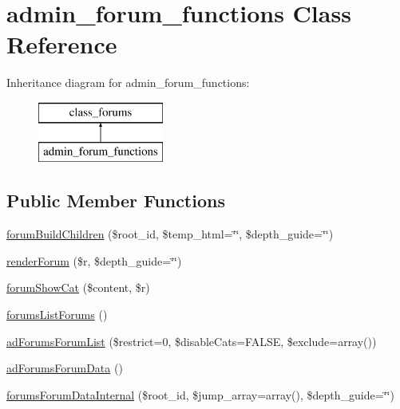 \hypertarget{classadmin__forum__functions}{\section{admin\-\_\-forum\-\_\-functions Class Reference}
\label{classadmin__forum__functions}
}
Inheritance diagram for admin\-\_\-forum\-\_\-functions\-:\begin{figure}[H]
\begin{center}
\leavevmode
\includegraphics[height=2.000000cm]{classadmin__forum__functions}
\end{center}
\end{figure}
\subsection*{Public Member Functions}
\begin{DoxyCompactItemize}
\item 
\hyperlink{classadmin__forum__functions_a2aa68cc501998312db5ef710bbe3a2af}{forum\-Build\-Children} (\$root\-\_\-id, \$temp\-\_\-html=\char`\"{}\char`\"{}, \$depth\-\_\-guide=\char`\"{}\char`\"{})
\item 
\hyperlink{classadmin__forum__functions_a60508b3baa05074bf4e2fe2e86cf1253}{render\-Forum} (\$r, \$depth\-\_\-guide=\char`\"{}\char`\"{})
\item 
\hyperlink{classadmin__forum__functions_a4c65a3aadef9cf1349e14708f1152d10}{forum\-Show\-Cat} (\$content, \$r)
\item 
\hyperlink{classadmin__forum__functions_a3a04624c66cef28d14a418b98560a116}{forums\-List\-Forums} ()
\item 
\hyperlink{classadmin__forum__functions_a1df3a83adcb5311bc242ccfc30ba0e77}{ad\-Forums\-Forum\-List} (\$restrict=0, \$disable\-Cats=F\-A\-L\-S\-E, \$exclude=array())
\item 
\hyperlink{classadmin__forum__functions_af6536dec7aa17c468961ce20bb232910}{ad\-Forums\-Forum\-Data} ()
\item 
\hyperlink{classadmin__forum__functions_a08fe8cbddf5e7c8e72619b7a9ef88dec}{forums\-Forum\-Data\-Internal} (\$root\-\_\-id, \$jump\-\_\-array=array(), \$depth\-\_\-guide=\char`\"{}\char`\"{})
\end{DoxyCompactItemize}
